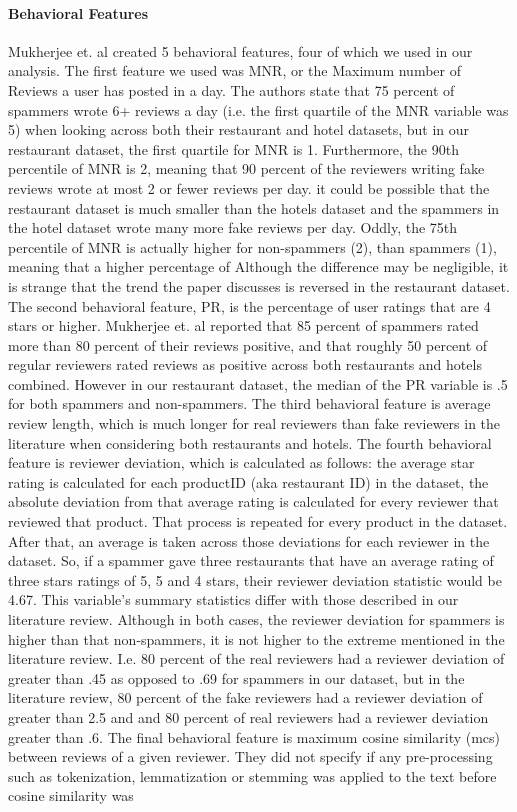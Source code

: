 \documentclass[man, floatsintext, 10pt]{apa6}
\begin{document}
\vspace{2mm}

\paragraph{Behavioral Features} Mukherjee et. al created 5 behavioral features, four of which we used in our analysis. The first feature we used was MNR, or the Maximum number of Reviews a user has posted in a day. The authors state that 75 percent of spammers wrote 6+ reviews a day (i.e. the first quartile of the MNR variable was 5)  when looking across both their restaurant and hotel datasets, but in our restaurant dataset, the first quartile for MNR is 1. Furthermore, the 90th percentile of MNR is 2, meaning that 90 percent of the reviewers writing fake reviews wrote at most 2 or fewer reviews per day. it could be possible that the restaurant dataset is much smaller than the hotels dataset and the spammers in the hotel dataset wrote many more fake reviews per day.  Oddly, the 75th percentile of MNR is actually higher for non-spammers (2), than spammers (1), meaning that a higher percentage of  Although the difference may be negligible, it is strange that the trend the paper discusses is reversed in the restaurant dataset. The second behavioral feature, PR, is the percentage of user ratings that are 4 stars or higher. Mukherjee et. al reported that 85 percent of spammers rated more than 80 percent of their reviews positive, and that roughly 50 percent of regular reviewers rated reviews as positive across both restaurants and hotels combined.  However in our restaurant dataset, the median of the PR variable is .5 for both spammers and non-spammers. The third behavioral feature is average review length, which is much longer for real reviewers than fake reviewers in the literature when considering both restaurants and hotels.  The fourth behavioral feature is reviewer deviation, which is calculated as follows: the average star rating is calculated for each productID (aka restaurant ID) in the dataset, the absolute deviation from that average rating is calculated for every reviewer that reviewed that product. That process is repeated for every product in the dataset. After that, an average is taken across those deviations for each reviewer in the dataset. So, if a spammer gave three restaurants that have an average rating of three stars ratings of 5, 5 and 4 stars, their reviewer deviation statistic would be 4.67. This variable's summary statistics differ with those described in our literature review. Although in both cases, the reviewer deviation for spammers is higher than that non-spammers, it is not higher to the extreme  mentioned in the literature review. I.e. 80 percent of the real reviewers had a reviewer deviation of greater than .45 as opposed to .69 for spammers in our dataset, but in the literature review, 80 percent of the fake reviewers had a reviewer deviation of greater than 2.5 and and 80 percent of real reviewers had a reviewer deviation greater than .6. The final behavioral feature is maximum cosine similarity (mcs) between reviews of a given reviewer. They did not specify if any pre-processing such as tokenization, lemmatization or stemming was applied to the text before cosine similarity was 
\end{document}
